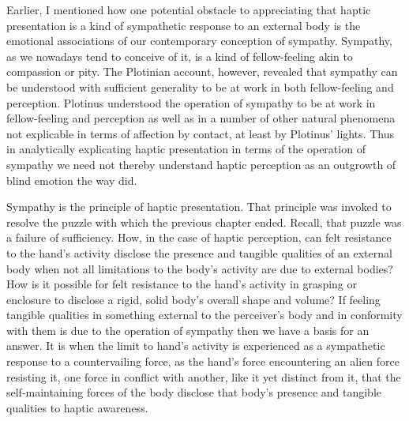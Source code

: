Earlier, I mentioned how one potential obstacle to appreciating that haptic presentation is a kind of sympathetic response to an external body is the emotional associations of our contemporary conception of sympathy. Sympathy, as we nowadays tend to conceive of it, is a kind of fellow-feeling akin to compassion or pity. The Plotinian account, however, revealed that sympathy can be understood with sufficient generality to be at work in both fellow-feeling and perception. Plotinus understood the operation of sympathy to be at work in fellow-feeling and perception as well as in a number of other natural phenomena not explicable in terms of affection by contact, at least by Plotinus' lights. Thus in analytically explicating haptic presentation in terms of the operation of sympathy we need not thereby understand haptic perception as an outgrowth of blind emotion the way \citet[162--3]{Whitehead:1978zr} did.

Sympathy is the principle of haptic presentation. That principle was invoked to resolve the puzzle with which the previous chapter ended. Recall, that puzzle was a failure of sufficiency. How, in the case of haptic perception, can felt resistance to the hand's activity disclose the presence and tangible qualities of an external body when not all limitations to the body's activity are due to external bodies? How is it possible for felt resistance to the hand’s activity in grasping or enclosure to disclose a rigid, solid body’s overall shape and volume? If feeling tangible qualities in something external to the perceiver’s body and in conformity with them is due to the operation of sympathy then we have a basis for an answer. It is when the limit to hand’s activity is experienced as a sympathetic response to a countervailing force, as the hand’s force encountering an alien force resisting it, one force in conflict with another, like it yet distinct from it, that the self-maintaining forces of the body disclose that body’s presence and tangible qualities to haptic awareness.

